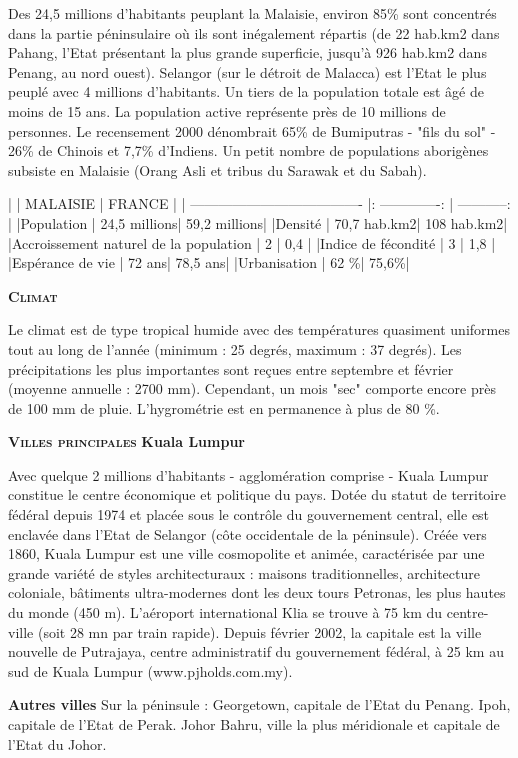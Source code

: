 \begin{multicols}{2}
Des 24,5 millions d'habitants peuplant la Malaisie, environ 85\% sont concentrés dans la partie péninsulaire où ils sont inégalement répartis (de 22 hab.km2 dans Pahang, l'Etat présentant la plus grande superficie, jusqu'à 926 hab.km2 dans Penang, au nord ouest). Selangor (sur le détroit de Malacca) est l'Etat le plus peuplé avec 4 millions d'habitants. Un tiers de la population totale est âgé de moins de 15 ans. La population active représente près de 10 millions de personnes. Le recensement 2000 dénombrait 65\% de Bumiputras - "fils du sol" - 26\% de Chinois et 7,7\% d'Indiens. Un petit nombre de populations aborigènes subsiste en Malaisie (Orang Asli et tribus du Sarawak et du Sabah).

|                                       |     MALAISIE    |    FRANCE    |
| ------------------------------------- |: -------------: | -----------: |
|Population                             |    24,5 millions| 59,2 millions|
|Densité                                |     70,7 hab.km2|   108 hab.km2|
|Accroissement naturel de la population |               2 |          0,4 |
|Indice de fécondité                    |               3 |          1,8 |
|Espérance de vie                       |           72 ans|      78,5 ans|
|Urbanisation                           |             62 \%|         75,6\%|

\textbf{\textsc{Climat}}

Le climat est de type tropical humide avec des températures quasiment uniformes tout au long de l'année (minimum : 25 degrés, maximum : 37 degrés). Les précipitations les plus importantes sont reçues entre septembre et février (moyenne annuelle : 2700 mm). Cependant, un mois "sec" comporte encore près de 100 mm de pluie. L'hygrométrie est en permanence à plus de 80 \%.

\textbf{\textsc{Villes principales}}
\textbf{Kuala Lumpur}

Avec quelque 2 millions d'habitants - agglomération comprise - Kuala Lumpur constitue le centre économique et politique du pays. Dotée du statut de territoire fédéral depuis 1974 et placée sous le contrôle du gouvernement central, elle est enclavée dans l'Etat de Selangor (côte occidentale de la péninsule). Créée vers 1860, Kuala Lumpur est une ville cosmopolite et animée, caractérisée par une grande variété de styles architecturaux : maisons traditionnelles, architecture coloniale, bâtiments ultra-modernes dont les deux tours Petronas, les plus hautes du monde (450 m). L'aéroport international Klia se trouve à 75 km du centre-ville (soit 28 mn par train rapide). Depuis février 2002, la capitale est la ville nouvelle de Putrajaya, centre administratif du gouvernement fédéral, à 25 km au sud de Kuala Lumpur (www.pjholds.com.my).

\textbf{Autres villes}
Sur la péninsule : Georgetown, capitale de l'Etat du Penang. Ipoh, capitale de l'Etat de Perak. Johor Bahru, ville la plus méridionale et capitale de l'Etat du Johor.

\end{multicols}

\vfill
